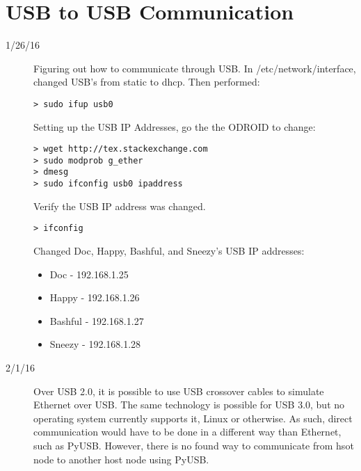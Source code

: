 \section{USB to USB Communication}
\begin{description}
\item [1/26/16] Figuring out how to communicate through USB. In /etc/network/interface, changed USB's from static to dhcp. Then performed:
\begin{lstlisting}
> sudo ifup usb0
\end{lstlisting}
Setting up the USB IP Addresses, go the the ODROID to change:
\begin{lstlisting}
> wget http://tex.stackexchange.com
> sudo modprob g_ether
> dmesg
> sudo ifconfig usb0 ipaddress
\end{lstlisting}

Verify the USB IP address was changed.
\begin{lstlisting}
> ifconfig
\end{lstlisting}
Changed Doc, Happy, Bashful, and Sneezy's USB IP addresses:
	\begin{itemize}
		\item Doc - 192.168.1.25
		\item Happy - 192.168.1.26
		\item Bashful - 192.168.1.27
		\item Sneezy - 192.168.1.28
	\end{itemize}
\item[2/1/16] Over USB 2.0, it is possible to use USB crossover cables to simulate Ethernet over USB. The same technology is possible for USB 3.0, but no operating system currently supports it, Linux or otherwise. As such, direct communication would have to be done in a different way than Ethernet, such as PyUSB. However, there is no found way to communicate from hsot node to another host node using PyUSB.
\end{description}


